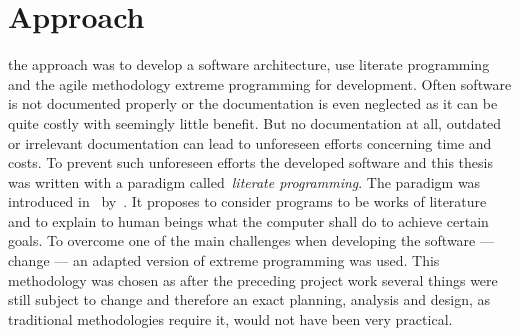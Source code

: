 
\section{Approach}

 the approach was to develop a software
architecture, use literate programming and the agile methodology extreme
programming for development. Often software is not documented properly or the
documentation is even neglected as it can be quite costly with seemingly little
benefit. But no documentation at all, outdated or irrelevant documentation can
lead to unforeseen efforts concerning time and costs. To prevent such unforeseen
efforts the developed software and this thesis was written with a paradigm
called~\emph{literate programming}. The paradigm was introduced
in~\citeyear{knuth-lp-1984} by~\citeauthor{knuth-lp-1984}. It proposes to
consider programs to be works of literature and to explain to human beings what
the computer shall do to achieve
certain goals. To overcome one of the main challenges when developing the software
--- change --- an adapted version of extreme programming was used. This
methodology was chosen as after the preceding project work several things were
still subject to change and therefore an exact planning, analysis and design, as
traditional methodologies require it, would not have been very practical.